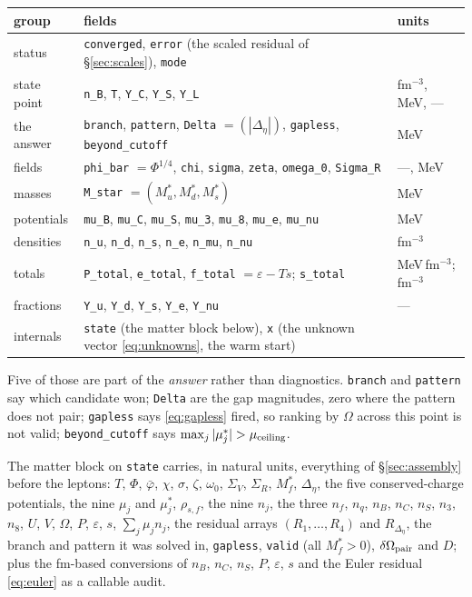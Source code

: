 \documentclass[11pt,a4paper]{article}
\newcommand{\phib}{\bar\varphi}
\newcommand{\Mstar}{M^{*}}
\newcommand{\mustar}{\mu^{*}}
\newcommand{\code}[1]{\texttt{#1}}
\begin{document}
\begin{center}
\begin{longtable}{lll}
\toprule
group & fields & units \\
\midrule
\endhead
status & \code{converged}, \code{error} (the scaled residual of
 \S\ref{sec:scales}), \code{mode} & \\
state point & \code{n\_B}, \code{T}, \code{Y\_C}, \code{Y\_S}, \code{Y\_L}
 & fm$^{-3}$, MeV, --- \\
the answer & \code{branch}, \code{pattern}, \code{Delta} $=(|\Delta_\eta|)$,
 \code{gapless}, \code{beyond\_cutoff} & MeV \\
fields & \code{phi\_bar} $=\Phi^{1/4}$, \code{chi}, \code{sigma},
 \code{zeta}, \code{omega\_0}, \code{Sigma\_R} & ---, MeV \\
masses & \code{M\_star} $=(\Mstar_u,\Mstar_d,\Mstar_s)$ & MeV \\
potentials & \code{mu\_B}, \code{mu\_C}, \code{mu\_S}, \code{mu\_3},
 \code{mu\_8}, \code{mu\_e}, \code{mu\_nu} & MeV \\
densities & \code{n\_u}, \code{n\_d}, \code{n\_s}, \code{n\_e},
 \code{n\_mu}, \code{n\_nu} & fm$^{-3}$ \\
totals & \code{P\_total}, \code{e\_total}, \code{f\_total} $=\varepsilon-Ts$;
 \code{s\_total} & MeV\,fm$^{-3}$; fm$^{-3}$ \\
fractions & \code{Y\_u}, \code{Y\_d}, \code{Y\_s}, \code{Y\_e}, \code{Y\_nu}
 & --- \\
internals & \code{state} (the matter block below), \code{x} (the unknown
 vector \eqref{eq:unknowns}, the warm start) & \\
\bottomrule
\end{longtable}
\end{center}

Five of those are part of the \emph{answer} rather than diagnostics.
\code{branch} and \code{pattern} say which candidate won; \code{Delta} are the
gap magnitudes, zero where the pattern does not pair; \code{gapless} says
\eqref{eq:gapless} fired, so ranking by $\Omega$ across this point is not
valid; \code{beyond\_cutoff} says $\max_j|\mustar_j| > \mu_{\rm ceiling}$.

The matter block on \code{state} carries, in natural units, everything of
\S\ref{sec:assembly} before the leptons: $T$, $\Phi$, $\phib$, $\chi$,
$\sigma$, $\zeta$, $\omega_0$, $\Sigma_V$, $\Sigma_R$, $\Mstar_f$,
$\Delta_\eta$, the five conserved-charge potentials, the nine $\mu_j$ and
$\mustar_j$, $\rho_{s,f}$, the nine $n_j$, the three $n_f$, $n_q$, $n_B$,
$n_C$, $n_S$, $n_3$, $n_8$, $U$, $V$, $\Omega$, $P$, $\varepsilon$, $s$,
$\sum_j\mu_jn_j$, the residual arrays $(R_1,\ldots,R_4)$ and
$R_{\Delta_\eta}$, the branch and pattern it was solved in, \code{gapless},
\code{valid} (all $\Mstar_f>0$), $\delta\Omega_{\rm pair}$ and $D$; plus the
fm-based conversions of $n_B$, $n_C$, $n_S$, $P$, $\varepsilon$, $s$ and the
Euler residual \eqref{eq:euler} as a callable audit.
\end{document}
